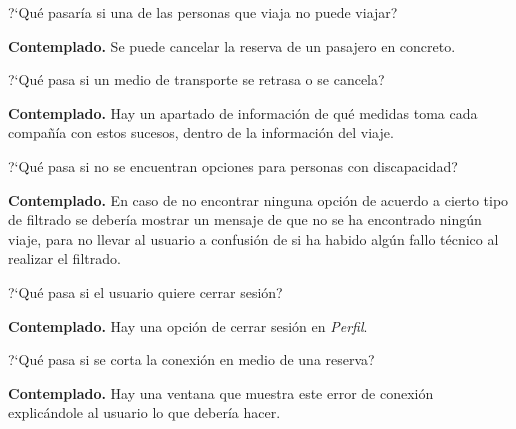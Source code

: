 \begin{escenario} %
    \centering
    ?`Qué pasaría si una de las personas que viaja no puede viajar?

    \begin{solucion}
        \centering
        \textbf{Contemplado.} Se puede cancelar la reserva de un pasajero en concreto.

    \end{solucion}
\end{escenario}

\begin{escenario} %
    \centering
    ?`Qué pasa si un medio de transporte se retrasa o se cancela?

    \begin{solucion}
        \centering
        \textbf{Contemplado.} Hay un apartado de información de qué medidas toma cada compañía con estos sucesos, dentro de la información del viaje.
    \end{solucion}
\end{escenario}

\begin{escenario} %
    \centering
    ?`Qué pasa si no se encuentran opciones para personas con discapacidad?

    \begin{solucion}
        \centering
        \textbf{Contemplado.} En caso de no encontrar ninguna opción de acuerdo a cierto tipo de filtrado se debería mostrar un mensaje de que no se ha encontrado ningún viaje, para no llevar al usuario a confusión de si ha habido algún fallo técnico al realizar el filtrado.
    \end{solucion}
\end{escenario}

\begin{escenario} %
    \centering
    ?`Qué pasa si el usuario quiere cerrar sesión?

    \begin{solucion}
        \centering
        \textbf{Contemplado.} Hay una opción de cerrar sesión en \textit{Perfil}.
    \end{solucion}
\end{escenario}

\begin{escenario} %
    \centering
    ?`Qué pasa si se corta la conexión en medio de una reserva?

    \begin{solucion}
        \centering
        \textbf{Contemplado.} Hay una ventana que muestra este error de conexión explicándole al usuario lo que debería hacer.
    \end{solucion}
\end{escenario}

